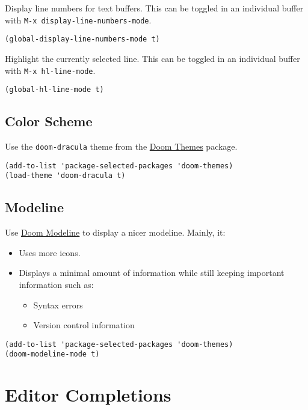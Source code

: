 \documentclass[11pt]{article}
\begin{document}
Display line numbers for text buffers. This can be toggled in an individual
buffer with \texttt{M-x display-line-numbers-mode}.

\begin{verbatim}
(global-display-line-numbers-mode t)
\end{verbatim}

Highlight the currently selected line. This can be toggled in an individual
buffer with \texttt{M-x hl-line-mode}.

\begin{verbatim}
(global-hl-line-mode t)
\end{verbatim}
\subsection{Color Scheme}
\label{sec:org070a2a2}

Use the \texttt{doom-dracula} theme from the \href{https://github.com/doomemacs/themes/tree/729ad034631cba41602ad9191275ece472c21941}{Doom Themes} package.

\begin{verbatim}
(add-to-list 'package-selected-packages 'doom-themes)
(load-theme 'doom-dracula t)
\end{verbatim}
\subsection{Modeline}
\label{sec:org3ec4279}

Use \href{https://github.com/seagle0128/doom-modeline/tree/297b57585fe3b3de9e694512170c44c6e104808f}{Doom Modeline} to display a nicer modeline. Mainly, it:

\begin{itemize}
\item Uses more icons.
\item Displays a minimal amount of information while still keeping
important information such as:
\begin{itemize}
\item Syntax errors
\item Version control information
\end{itemize}
\end{itemize}

\begin{verbatim}
(add-to-list 'package-selected-packages 'doom-themes)
(doom-modeline-mode t)
\end{verbatim}
\section{Editor Completions}
\label{sec:org49d8fe6}
\end{document}
